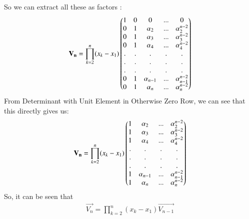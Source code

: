 \documentclass[journal,12pt,twocolumn]{IEEEtran}
\begin{document}
So we can extract all these as factors :
\begin{align}
\mathbf{V_n} = \prod_{k=2}^n(x_k - x_1)
    \begin{pmatrix}1 & 0 & 0 & ... & 0 \\
    0 & 1 & \alpha_2 & ... & \alpha_2^{n-2}\\
    0 & 1 & \alpha_3 & ... & \alpha_3^{n-2}\\
    0 & 1 & \alpha_4 & ... & \alpha_4^{n-2} \\
    . & . & . & . & . \\
    . & . & . & . & . \\
    . & . & . & . & . \\
    0 & 1 & \alpha_{n-1} & ... & \alpha_{n-1}^{n-2}\\
    0 & 1 & \alpha_n & ... & \alpha_n^{n-2} 
    \end{pmatrix}
\end{align}
From Determinant with Unit Element in Otherwise Zero Row, we can see that this directly gives us:
\begin{align}
\mathbf{V_n} = \prod_{k=2}^n(x_k - x_1)
    \begin{pmatrix}
    1 & \alpha_2 & ... & \alpha_2^{n-2}\\
    1 & \alpha_3 & ... & \alpha_3^{n-2}\\
    1 & \alpha_4 & ... & \alpha_4^{n-2} \\
    . & . & . & . \\
    . & . & . & . \\
    . & . & . & . \\
    1 & \alpha_{n-1} & ... & \alpha_{n-1}^{n-2}\\
    1 & \alpha_n & ... & \alpha_n^{n-2} 
    \end{pmatrix}
\end{align}
So, it can be seen that 
\begin{align}
    \vec{V_n} = \prod_{k=2}^n(x_k - x_1)\vec{V_{n-1}}
\end{align}
\end{document}
